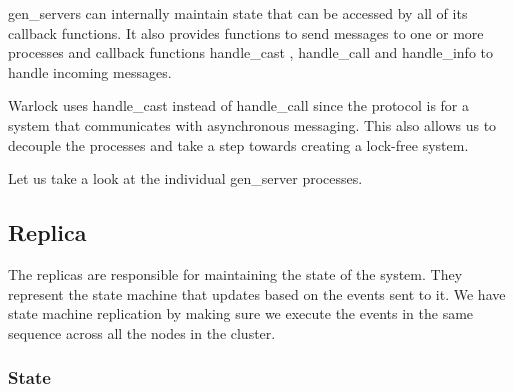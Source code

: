 gen\_servers can internally maintain state that can be accessed by all of its 
callback functions. It also provides functions to send messages%
to one or more processes and callback functions handle\_cast%
, handle\_call%
 and handle\_info%
to handle incoming messages.

Warlock uses handle\_cast instead of handle\_call since the protocol is for 
a system that communicates with asynchronous messaging. This also allows us
to decouple the processes and take a step towards creating a lock-free system.

Let us take a look at the individual gen\_server processes.

\subsection{Replica}

The replicas are responsible for maintaining the state of the system. They
represent the state machine that updates based on the events sent to it. We
have state machine replication by making sure we execute the events in the same
sequence across all the nodes in the cluster.

\subsubsection{State}

